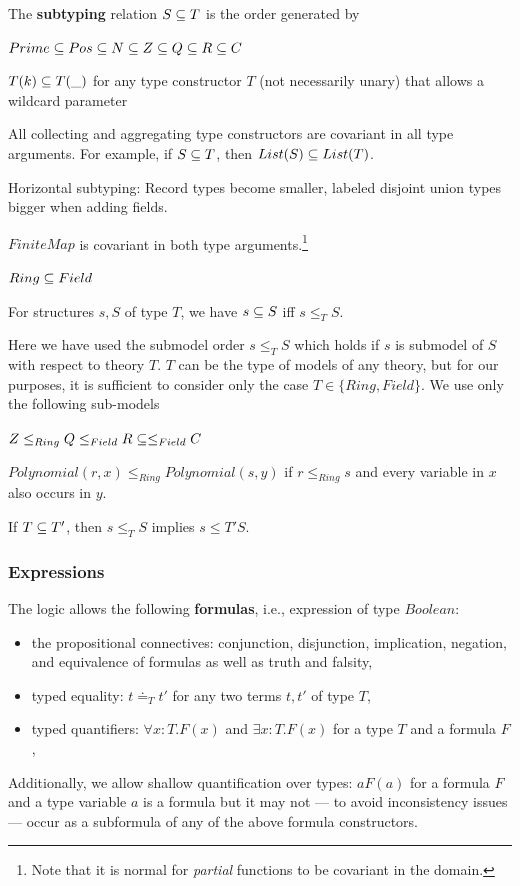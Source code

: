 The \textbf{subtyping} relation $S\subseteq T$ is the order generated by
\begin{compactitem}
 \item $Prime\subseteq Pos\subseteq N\subseteq Z\subseteq Q\subseteq R\subseteq C$
 \item $T(k)\subseteq T(\_)$ for any type constructor $T$ (not necessarily unary) that allows a wildcard parameter
 \item All collecting and aggregating type constructors are covariant in all type arguments. For example, if $S\subseteq T$, then $List(S)\subseteq List(T)$.
 \item Horizontal subtyping: Record types become smaller, labeled disjoint union types bigger when adding fields.
 \item $FiniteMap$ is covariant in both type arguments.\footnote{Note that it is normal for \emph{partial} functions to be covariant in the domain.}
 \item $Ring\subseteq Field$
 \item For structures $s,S$ of type $T$, we have $s\subseteq S$ iff $s\leq_T S$. 
\end{compactitem}

Here we have used the submodel order $s\leq_T S$ which holds if $s$ is submodel of $S$ with respect to theory $T$.
$T$ can be the type of models of any theory, but for our purposes, it is sufficient to consider only the case $T\in\{Ring,Field\}$.
We use only the following sub-models
\begin{compactitem}
 \item $Z\leq_{Ring} Q\leq_{Field} R\subseteq\leq_{Field} C$
 \item $Polynomial(r,x)\leq_{Ring} Polynomial(s,y)$ if $r\leq_{Ring} s$ and every variable in $x$ also occurs in $y$.
 \item If $T\subseteq T'$, then $s\leq_T S$ implies $s\leq{T'}S$.
\end{compactitem}

\subsubsection{Expressions}

The logic allows the following \textbf{formulas}, i.e., expression of type $Boolean$:
\begin{itemize}
\item the propositional connectives: conjunction, disjunction, implication, negation, and equivalence of formulas as well as truth and falsity,
\item typed equality: $t\doteq_T t'$ for any two terms $t,t'$ of type $T$,
\item typed quantifiers: $\forall x:T.F(x)$ and $\exists x:T.F(x)$ for a type $T$ and a formula $F$,
\end{itemize}
Additionally, we allow shallow quantification over types: ${a}F(a)$ for a formula $F$ and a type variable $a$ is a formula but it may not --- to avoid inconsistency issues --- occur as a subformula of any of the above formula constructors.

